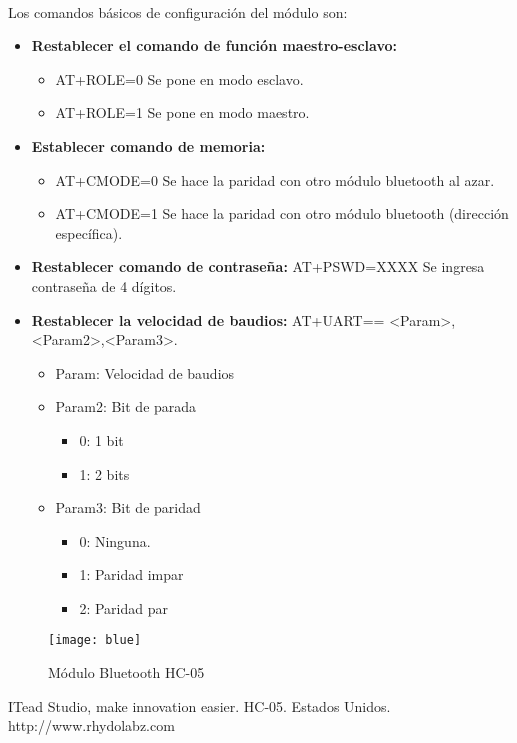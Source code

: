 \\ Los comandos básicos de configuración del módulo son:
\begin{itemize}
    \item \textbf{Restablecer el comando de función maestro-esclavo:}
    \begin{itemize}
        \item AT+ROLE=0 Se pone en modo esclavo.
        \item AT+ROLE=1 Se pone en modo maestro.
    \end{itemize}
    \item \textbf{Establecer comando de memoria:}
    \begin{itemize}
        \item AT+CMODE=0 Se hace la paridad con otro módulo bluetooth al azar.
        \item AT+CMODE=1 Se hace la paridad con otro módulo bluetooth (dirección específica).
    \end{itemize}
    \item \textbf{Restablecer comando de contraseña:} AT+PSWD=XXXX Se ingresa contraseña de 4 dígitos.
    \item \textbf{Restablecer la velocidad de baudios:} AT+UART== <Param>,<Param2>,<Param3>. 
    \begin{itemize}
        \item Param: Velocidad de baudios
        \item Param2: Bit de parada
            \begin{itemize}
                \item 0: 1 bit
                \item 1: 2 bits
            \end{itemize}
        \item Param3: Bit de paridad
            \begin{itemize}
                \item 0: Ninguna.
                \item 1: Paridad impar
                \item 2: Paridad par
            \end{itemize}
    \end{itemize}
\end{itemize}
\begin{figure}[h]
    \centering
    \texttt{[image: blue]}
    \caption{Módulo Bluetooth HC-05}
    \label{fig:mesh1}
\end{figure}

ITead Studio, make innovation easier. HC-05. Estados Unidos. http://www.rhydolabz.com
